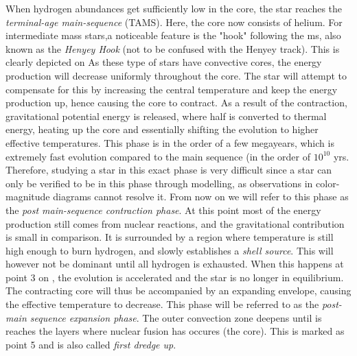 When hydrogen abundances get sufficiently low in the core, the star reaches the \textit{terminal-age main-sequence} (TAMS). Here, the core now consists of helium.
For intermediate mass stars,a noticeable feature is the "hook" following the ms, also known as the \textit{Henyey Hook} (not to be confused with the Henyey track). This is clearly depicted on  As these type of stars have convective cores, the energy production will decrease uniformly throughout the core. The star will attempt to compensate for this by increasing the central temperature and keep the energy production up, hence causing the core to contract. As a result of the contraction, gravitational potential energy is released, where half is converted to thermal energy, heating up the core and essentially shifting the evolution to higher effective temperatures. This phase is in the order of a few megayears, which is extremely fast evolution compared to the main sequence (in the order of $10^{10}$ yrs. Therefore, studying a star in this exact phase is very difficult since a star can only be verified to be in this phase through modelling, as observations in color-magnitude diagrams cannot resolve it. From now on we will refer to this phase as the \textit{post main-sequence contraction phase}. At this point most of the energy production still comes from nuclear reactions, and the gravitational contribution is small in comparison.  It is surrounded by a region where temperature is still high enough to burn hydrogen, and slowly establishes a \textit{shell source}. This will however not be dominant until all hydrogen is exhausted. When this happens at point 3 on , the evolution is accelerated and the star is no longer in equilibrium. The contracting core will thus be accompanied by an expanding envelope, causing the effective temperature to decrease. This phase will be referred to as the \textit{post- main sequence expansion phase}. The outer convection zone deepens until is reaches the layers where nuclear fusion has occures (the core). This is marked as point 5 and is also called \textit{first dredge up}. 

